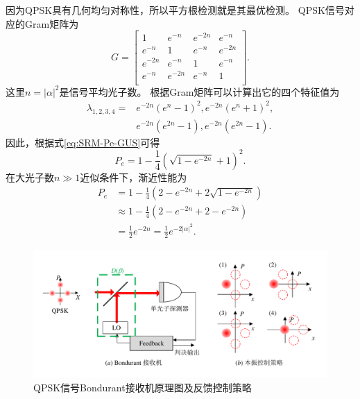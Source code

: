 因为QPSK具有几何均匀对称性，所以平方根检测就是其最优检测。
QPSK信号对应的Gram矩阵为
\begin{equation}
G = \left[
\begin{array}{cccc}
 1 & e^{-n} & e^{-2 n} & e^{-n} \\
 e^{-n} & 1 & e^{-n} & e^{-2 n} \\
 e^{-2 n} & e^{-n} & 1 & e^{-n} \\
 e^{-n} & e^{-2 n} & e^{-n} & 1 \\
\end{array}
\right].
\end{equation}
这里$n = |\alpha|^2$是信号平均光子数。
根据Gram矩阵可以计算出它的四个特征值为
\begin{equation}
\begin{split}
\lambda_{1,2,3,4} = & e^{-2 n} \left(e^n-1\right)^2,e^{-2 n} \left(e^n+1\right)^2, \\
                    & e^{-2 n} \left(e^{2 n}-1\right),e^{-2 n} \left(e^{2 n}-1\right).
\end{split}
\end{equation}
因此，根据式\ref{eq:SRM-Pe-GUS}可得
\begin{equation}
P_e = 1-\frac{1}{4} \left(\sqrt{1-e^{-2 n}}+1\right)^2.
\label{eq:QPSK-Hel-error}
\end{equation}
在大光子数$n \gg 1$近似条件下，渐近性能为
\begin{equation}
\begin{split}
P_e &= 1-\frac{1}{4} (2 - e^{-2n} + 2\sqrt{1-e^{-2n}}) \\
    &\approx 1-\frac{1}{4} (2 - e^{-2n} + 2- e^{-2n}) \\
    &= \frac{1}{2} e^{-2n} =  \frac{1}{2} e^{-2|\alpha|^2}.
\label{eq:QPSK-Hel-approx}
\end{split}
\end{equation}


\begin{figure}
\centering
  \includegraphics[width=\textwidth]{figures/chap2/QPSK-Bondurant-receiver}
  \caption{QPSK信号Bondurant接收机原理图及反馈控制策略}
  \label{fig:QPSK-Boundurant-receiver}
\end{figure}


